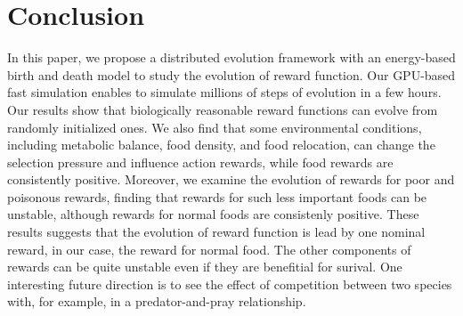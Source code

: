 \section{Conclusion}
In this paper, we propose a distributed evolution framework with an energy-based birth and death model to study the evolution of reward function. Our GPU-based fast simulation enables to simulate millions of steps of evolution in a few hours. Our results show that biologically reasonable reward functions can evolve from randomly initialized ones. We also find that some environmental conditions, including metabolic balance, food density, and food relocation, can change the selection pressure and influence action rewards, while food rewards are consistently positive. Moreover, we examine the evolution of rewards for poor and poisonous rewards, finding that rewards for such less important foods can be unstable, although rewards for normal foods are consistenly positive. These results suggests that the evolution of reward function is lead by one nominal reward, in our case, the reward for normal food. The other components of rewards can be quite unstable even if they are benefitial for surival. One interesting future direction is to see the effect of competition between two species with, for example, in a predator-and-pray relationship.
